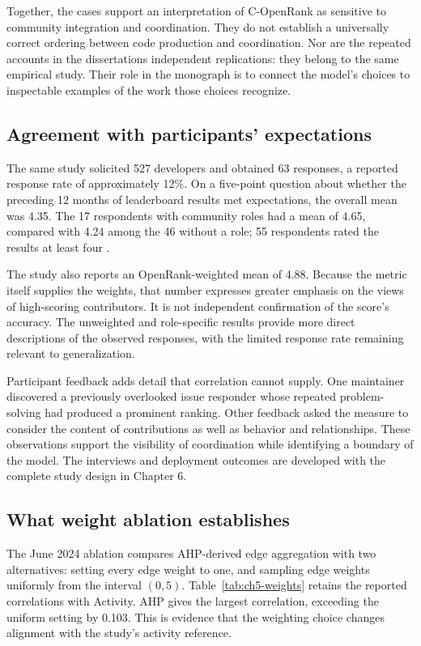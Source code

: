 Together, the cases support an interpretation of C-OpenRank as sensitive to community integration and coordination. They do not establish a universally correct ordering between code production and coordination. Nor are the repeated accounts in the dissertations independent replications: they belong to the same empirical study. Their role in the monograph is to connect the model's choices to inspectable examples of the work those choices recognize.

\subsection{Agreement with participants' expectations}
The same study solicited 527 developers and obtained 63 responses, a reported response rate of approximately 12\%. On a five-point question about whether the preceding 12 months of leaderboard results met expectations, the overall mean was 4.35. The 17 respondents with community roles had a mean of 4.65, compared with 4.24 among the 46 without a role; 55 respondents rated the results at least four \citep[Section 4.1.2]{zhao2024}.

The study also reports an OpenRank-weighted mean of 4.88. Because the metric itself supplies the weights, that number expresses greater emphasis on the views of high-scoring contributors. It is not independent confirmation of the score's accuracy. The unweighted and role-specific results provide more direct descriptions of the observed responses, with the limited response rate remaining relevant to generalization.

Participant feedback adds detail that correlation cannot supply. One maintainer discovered a previously overlooked issue responder whose repeated problem-solving had produced a prominent ranking. Other feedback asked the measure to consider the content of contributions as well as behavior and relationships. These observations support the visibility of coordination while identifying a boundary of the model. The interviews and deployment outcomes are developed with the complete study design in Chapter 6.
\subsection{What weight ablation establishes}
The June 2024 ablation compares AHP-derived edge aggregation with two alternatives: setting every edge weight to one, and sampling edge weights uniformly from the interval $(0,5)$. Table~\ref{tab:ch5-weights} retains the reported correlations with Activity. AHP gives the largest correlation, exceeding the uniform setting by 0.103. This is evidence that the weighting choice changes alignment with the study's activity reference.

